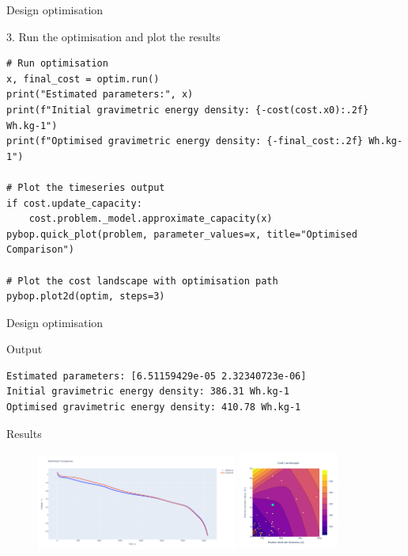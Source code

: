 \documentclass[aspectratio=169]{beamer} %
\begin{document}
\begin{frame}[fragile,t]{Design optimisation}
    \vspace{-2cm}
    \begin{block}{3. Run the optimisation and plot the results}
    \begin{lstlisting}[firstnumber=1, xleftmargin=10pt]
# Run optimisation
x, final_cost = optim.run()
print("Estimated parameters:", x)
print(f"Initial gravimetric energy density: {-cost(cost.x0):.2f} Wh.kg-1")
print(f"Optimised gravimetric energy density: {-final_cost:.2f} Wh.kg-1")

# Plot the timeseries output
if cost.update_capacity:
    cost.problem._model.approximate_capacity(x)
pybop.quick_plot(problem, parameter_values=x, title="Optimised Comparison")

# Plot the cost landscape with optimisation path
pybop.plot2d(optim, steps=3)
    \end{lstlisting}
    \end{block}
\end{frame}

\begin{frame}[fragile,t]{Design optimisation}
    \vspace{-6mm}
    \begin{block}{Output}
    \begin{lstlisting}[firstnumber=1, xleftmargin=10pt]
Estimated parameters: [6.51159429e-05 2.32340723e-06]
Initial gravimetric energy density: 386.31 Wh.kg-1
Optimised gravimetric energy density: 410.78 Wh.kg-1
    \end{lstlisting}
    \end{block}
    Results
    \vspace{-3mm}
    \begin{figure}
        \centering
        \includegraphics[width=0.59\textwidth, trim={0 0 0 0},clip]{Images/MaxEnergy_quick_plot.png}
        \includegraphics[width=0.29\textwidth, trim={0 0 0 0},clip]{Images/MaxEnergy_cost_trace.png} \\
        \label{fig:design_optimisation}
    \end{figure}
\end{frame}
\end{document}

